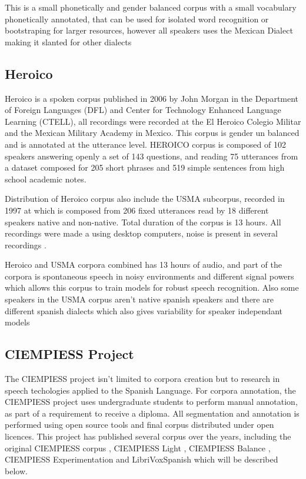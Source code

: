 \documentclass[10pt, a4paper]{article}
\begin{document}
This is a small phonetically and gender balanced corpus with a small vocabulary phonetically annotated, that can be used for isolated word recognition or bootstraping for larger resources, however all speakers uses the Mexican Dialect making it slanted for other dialects

\subsection{Heroico}

Heroico is a spoken corpus published in 2006 by John Morgan in the Department of Foreign Languages (DFL) and Center for Technology Enhanced Language Learning (CTELL), all recordings were recorded at the El Heroico Colegio Militar and the Mexican Military Academy in Mexico. This corpus is gender un balanced and is annotated at the utterance level. HEROICO corpus is composed of 102 speakers answering openly a set of 143 questions, and  reading 75 utterances from a dataset composed for 205 short phrases and 519 simple sentences from high school academic notes.

Distribution of Heroico corpus also include the USMA subcorpus, recorded in 1997 at which is composed from 206 fixed utterances read by 18 different speakers native and non-native. Total duration of the corpus is 13 hours. All recordings were made a using desktop computers, noise is present in several recordings \cite{heroico}.

Heroico and USMA corpora combined has 13 hours of audio, and part of the corpora is spontaneous speech in noisy environments and different signal powers which allows this corpus to train models for robust speech recognition. Also some speakers in the USMA corpus aren't native spanish speakers and there are different spanish dialects which also gives variability for speaker independant models
 

\subsection{CIEMPIESS Project}

 The CIEMPIESS project isn't limited to corpora creation but to research in speech techologies applied to the Spanish Language. For corpora annotation, the CIEMPIESS project uses undergraduate students to perform manual annotation, as part of a requirement to receive a diploma. All segmentation and annotation is performed using open source tools and final corpus distributed under open licences. This project has published several corpus over the years, including the original CIEMPIESS corpus \cite{CIEMPIESS}, CIEMPIESS Light \cite{CIEMPIESS-LIGHT}, CIEMPIESS Balance \cite{CIEMPIESS-BALANCE}, CIEMPIESS Experimentation \cite{CIEMPIESS-Experimentation} and LibriVoxSpanish \cite{LibriVox-Spanish} which will be described below.
\end{document}
